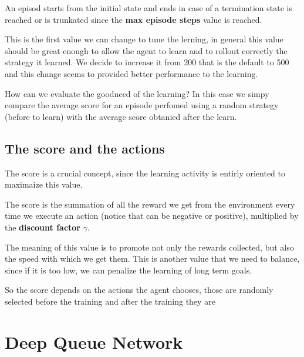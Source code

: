 \documentclass{article}
\begin{document}
An episod starts from the initial state and ends in case of a termination state is reached or is trunkated since the \textbf{max episode steps} value is reached.

This is the first value we can change to tune the lerning, in general this value should be great enough to allow the agent to learn and to rollout correctly the strategy it learned.
We decide to increase it from 200 that is the default to 500 and this change seems to provided better performance to the learning.

How can we evaluate the goodneed of the learning? In this case we simpy compare the average score for an episode perfomed using a random strategy (before to learn)
with the average score obtanied after the learn.

\subsection{The score and the actions}

The score is a crucial concept, since the learning activity is entirly oriented to maximaize this value.

The score is the summation of all the reward we get from the environment every time we execute an action (notice that can be negative or positive),
multiplied by the \textbf{discount factor} $\gamma$.

The meaning of this value is to promote not only the rewards collected, but also the speed with which we get them.
This is another value that we need to balance, since if it is too low, we can penalize the learning of long term goals.

So the score depends on the actions the agent chooses, those are randomly selected before the training and after the training they are 

\section{Deep Queue Network}
\end{document}
